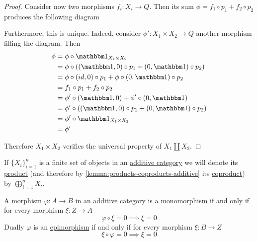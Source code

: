\documentclass[../../../main]{subfiles}
\begin{document}
\begin{proof}
  Consider now two morphisms \(f_{i}: X_{i} \to Q\).
  Then its sum \(\phi = f_{1} \circ p_{1} + f_{2} \circ p_{2}\) produces the following diagram
  \begin{center}
  \end{center}
  Furthermore, this is unique.
  Indeed, consider \(\phi': X_{1} \times X_{2} \to Q\) another morphism filling the diagram. Then
  \begin{align*}
    \phi &= \phi \circ \id_{X_{1} \times X_{2}} \\
      &= \phi \circ ( (\id, 0) \circ p_{1} + (0, \id) \circ p_{2} ) \\
      &= \phi \circ (id, 0) \circ p_{1} + \phi \circ (0, \id) \circ p_{2} \\
      &= f_{1} \circ p_{1} + f_{2} \circ p_{2} \\
      &= \phi' \circ (\id, 0) + \phi' \circ (0, \id) \\
      &= \phi' \circ ( (\id, 0) \circ p_{1} + (0, \id) \circ p_{2} ) \\
      &= \phi' \circ \id_{X_{1} \times X_{2}} \\
      &= \phi'
  \end{align*}

  Therefore \(X_{1} \times X_{2}\) verifies the universal property of \(X_{1} \amalg X_{2}\).
\end{proof}

\begin{notation}
  If \(\{X_{i}\}_{i=1}^{n}\) is a finite set of objects in an \hyperref[def:additive-category]{additive category} we will denote its \hyperref[def:categorical-product]{product} (and therefore by \autoref{lemma:products-coproducts-additive} its \hyperref[def:categorical-coproduct]{coproduct}) by \(\bigoplus_{i=1}^{n} X_{i}\).
\end{notation}

\begin{lemma} \label{lemma:mono-epi-additive}
  A morphism \(\varphi: A \to B\) in an \hyperref[def:additive-category]{additive category} is a \hyperref[def:mono-epi-morphism]{monomorphism} if and only if for every morphism \(\xi: Z \to A\)
  \begin{equation*}
    \varphi \circ \xi = 0 \implies \xi = 0
  \end{equation*}
  Dually \(\varphi\) is an \hyperref[def:mono-epi-morphism]{epimorphism} if and only if for every morphism \(\xi: B \to Z\)
  \begin{equation*}
    \xi \circ \varphi = 0 \implies \xi = 0
  \end{equation*}
\end{lemma}
\end{document}
